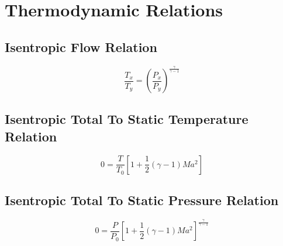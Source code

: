 \documentclass{article}
\begin{document}
\pagebreak

\section{Thermodynamic Relations\hfil\cite{RPE}}

\subsection{Isentropic Flow Relation}
\begin{equation} \tag{1.1}
    \frac{T_x}{T_y} = \left(\frac{P_x}{P_y}\right) ^ {\frac{\gamma}{\gamma - 1}}
\end{equation}

\subsection{Isentropic Total To Static Temperature Relation}
\begin{equation} \tag{1.2}
    0 = \frac{T}{T_0} \left[1 + \frac{1}{2} \left(\gamma - 1\right) Ma ^ 2\right]
\end{equation}

\subsection{Isentropic Total To Static Pressure Relation}
\begin{equation} \tag{1.3}
    0 = \frac{P}{P_0} \left[1 + \frac{1}{2} \left(\gamma - 1\right) Ma ^ 2\right] ^ {\frac{\gamma}{\gamma - 1}}
\end{equation}


\pagebreak



\end{document}
